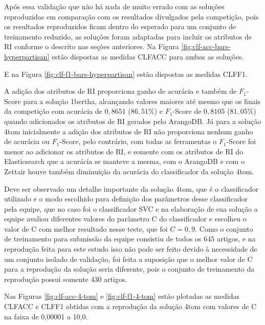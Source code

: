 			

			Após essa validação que não há nada de muito errado com as soluções reproduzidas em comparação com os resultados divulgados pela competição, pois os resultados reproduzidos ficam dentro do esperado para um conjunto de treinamento reduzido, as soluções foram adaptadas para incluir os atributos de RI conforme o descrito nas seções anteriores.
			Na Figura \ref{fig:clf-acc-bars-hyperpartisan} estão dispostas as medidas CLF\underscore{}ACC para ambas as soluções.
			
			

			E na Figura \ref{fig:clf-f1-bars-hyperpartisan} estão dispostas as medidas CLF\underscore{}F1.
			
			

			A adição dos atributos de RI proporciona ganho de acurácia e também de $F_1$-Score para a solução 1\underscore{}bertha, alcançando valores maiores até mesmo que os finais da competição com acurácia de $0,8651$ ($86,51\%$) e $F_1$-Score de $0,8105$ ($81,05\%$) quando adicionados os atributos de RI gerados pelo ArangoDB.
			Já para a solução 4\underscore{}tom inicialmente a adição dos atributos de RI não proporciona nenhum ganho de acurácia ou $F_1$-Score, pelo contrário, com todas as ferramentas o $F_1$-Score foi menor ao adicionar os atributos de RI, e somente com os atributos de RI do Elasticsearch que a acurácia se manteve a mesma, com o ArangoDB e com o Zettair houve também diminuição da acurácia do classificador da solução 4\underscore{}tom.

			Deve ser observado um detalhe importante da solução 4\underscore{}tom, que é o classificador utilizado e o modo escolhido para definição dos parâmetros desse classificador pela equipe, que no caso foi o classificador SVC e na elaboração de sua solução a equipe avaliou diferentes valores do parâmetro C do classificador e escolheu o valor de C com melhor resultado nesse teste, que foi $C = 0,9$.
			Como o conjunto de treinamento para submissão da equipe consistiu de todos os 645 artigos, e na reprodução feita para este estudo isso não pode ser feito devido à necessidade de um conjunto isolado de validação, foi feita a suposição que o melhor valor de C para a reprodução da solução seria diferente, pois o conjunto de treinamento da reprodução possui somente 430 artigos.
			
			Nas Figuras \ref{fig:clf-acc-4-tom} e \ref{fig:clf-f1-4-tom} estão plotadas as medidas CLF\underscore{}ACC e CLF\underscore{}F1 obtidas com a reprodução da solução 4\underscore{}tom com valores de C na faixa de 0,00001 a 10,0.
			
